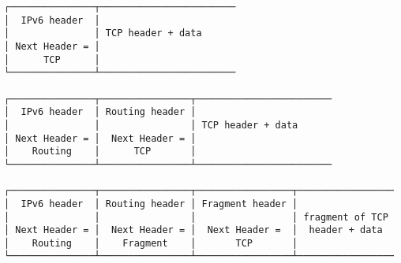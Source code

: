 \documentclass[varwidth=48em,crop]{standalone}
\begin{document}
\begin{verbatim}
┌───────────────┬────────────────────────
│  IPv6 header  │ 
│               │ TCP header + data
│ Next Header = │
│      TCP      │
└───────────────┴────────────────────────

┌───────────────┬────────────────┬────────────────────────
│  IPv6 header  │ Routing header │ 
│               │                │ TCP header + data
│ Next Header = │  Next Header = │
│    Routing    │      TCP       │
└───────────────┴────────────────┴────────────────────────

┌───────────────┬────────────────┬─────────────────┬─────────────────
│  IPv6 header  │ Routing header │ Fragment header │
│               │                │                 │ fragment of TCP
│ Next Header = │  Next Header = │  Next Header =  │  header + data
│    Routing    │    Fragment    │       TCP       │
└───────────────┴────────────────┴─────────────────┴─────────────────
\end{verbatim}
\end{document}
